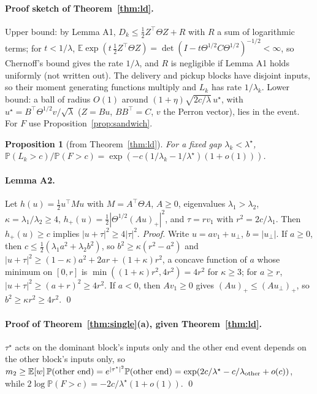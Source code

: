 \documentclass[11pt]{article}
\newtheorem{proposition}[theorem]{Proposition}
\theoremstyle{definition}
\theoremstyle{remark}
\newcommand{\E}{\mathbb{E}}
\renewcommand{\P}{\mathbb{P}}
\begin{document}
{\paragraph{Proof sketch of Theorem~\ref{thm:ld}.} Upper bound: by Lemma A1,
$D_k\le \tfrac12 Z^\top\Theta Z + R$ with $R$ a sum of logarithmic terms; for
$t<1/\lambda$, $\E\exp(t\,\tfrac12 Z^\top\Theta Z) =
\det(I - t\Theta^{1/2}C\Theta^{1/2})^{-1/2}<\infty$, so Chernoff's bound gives the
rate $1/\lambda$, and $R$ is negligible if Lemma A1 holds uniformly (not
written out). The delivery and pickup blocks have disjoint inputs, so their
moment generating functions multiply and $L_k$ has rate $1/\lambda_k$. Lower
bound: a ball of radius $O(1)$ around $(1+\eta)\sqrt{2c/\lambda}\,u^\star$, with
$u^\star = B^\top\Theta^{1/2}v/\sqrt\lambda$ ($Z=Bu$, $BB^\top = C$, $v$ the Perron
vector), lies in the event. For $F$ use Proposition~\ref{prop:sandwich}.

\begin{proposition}[from Theorem~\ref{thm:ld}]\label{prop:mass}
For a fixed gap $\lambda_k<\lambda^\star$,
$\P(L_k>c)/\P(F>c) = \exp(-c(1/\lambda_k-1/\lambda^\star)(1+o(1)))$.
\end{proposition}

\paragraph{Lemma A2.} Let $h(u) = \tfrac12 u^\top M u$ with $M=A^\top\Theta A$,
$A\ge 0$, eigenvalues $\lambda_1>\lambda_2$, $\kappa=\lambda_1/\lambda_2\ge 4$,
$h_+(u) = \tfrac12|\Theta^{1/2}(Au)_+|^2$, and $\tau = r v_1$ with
$r^2 = 2c/\lambda_1$. Then $h_+(u)\ge c$ implies $|u+\tau|^2\ge 4|\tau|^2$.
\emph{Proof.} Write $u = a v_1 + u_\perp$, $b=|u_\perp|$. If $a\ge0$, then
$c\le\tfrac12(\lambda_1a^2+\lambda_2b^2)$, so $b^2\ge\kappa(r^2-a^2)$ and
$|u+\tau|^2\ge(1-\kappa)a^2+2ar+(1+\kappa)r^2$, a concave function of $a$
whose minimum on $[0,r]$ is $\min((1+\kappa)r^2,4r^2) = 4r^2$ for $\kappa\ge3$;
for $a\ge r$, $|u+\tau|^2\ge(a+r)^2\ge4r^2$. If $a<0$, then $Av_1\ge0$ gives
$(Au)_+\le(Au_\perp)_+$, so $b^2\ge\kappa r^2\ge4r^2$. \qed

\paragraph{Proof of Theorem~\ref{thm:single}(a), given Theorem~\ref{thm:ld}.}
$\tau^\star$ acts on the dominant block's inputs only and the other end event
depends on the other block's inputs only, so $m_2\ge\E[w]\,\P(\text{other end})=
e^{|\tau^\star|^2}\P(\text{other end}) = \exp(2c/\lambda^\star - c/\lambda_{\rm other}+o(c))$,
while $2\log\P(F>c) = -2c/\lambda^\star(1+o(1))$. \qed

}
\end{document}
